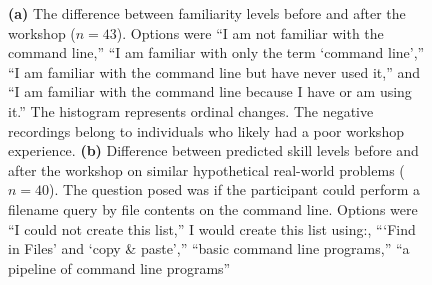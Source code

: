 \documentclass[10pt, twocolumn]{article}
\begin{document}
\begin{figure}
\begin{subfigure}[t]{0.47\columnwidth}
\end{subfigure}
\caption{
    \textbf{(a)} The difference between familiarity levels before and after the workshop ($n=43$). 
    Options were ``I am not familiar with the command line,'' 
    ``I am familiar with only the term `command line','' 
    ``I am familiar with the command line but have never used it,'' 
    and ``I am familiar with the command line because I have or am using it.'' 
    The histogram represents ordinal changes. 
    The negative recordings belong to individuals
    who likely had a poor workshop experience.
    \textbf{(b)} Difference between predicted skill levels 
    before and after the workshop on similar hypothetical real-world problems ($n=40$). 
    The question posed was if the participant could perform a filename query by file contents on the command line. 
    Options were ``I could not create this list,'' 
    I would create this list using:, 
    ```Find in Files' and `copy \& paste','' 
    ``basic command line programs,'' 
    ``a pipeline of command line programs''
    }
\label{shellFamiliarityAndSkill}
\end{figure}
\end{document}
